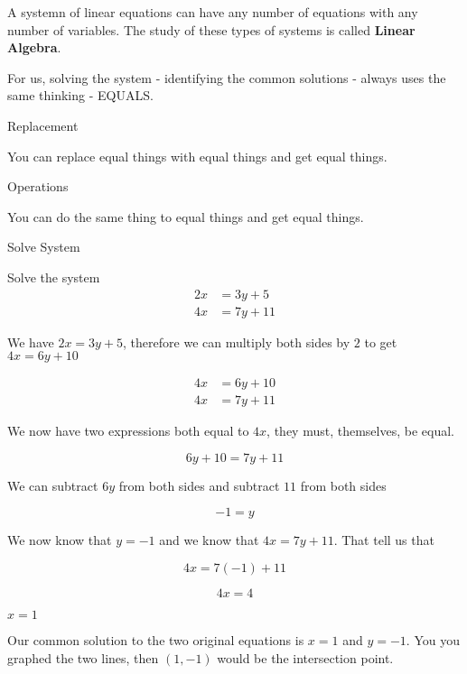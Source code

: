\documentclass{ximera}
\begin{document}
A systemn of linear equations can have any number of equations with any number of variables.  The study of these types of systems is called \textbf{Linear Algebra}.

For us, solving the system - identifying the common solutions - always uses the same thinking - EQUALS.



\begin{fact} Replacement

You can replace equal things with equal things and get equal things.

\end{fact}


\begin{fact} Operations

You can do the same thing to equal things and get equal things.

\end{fact}






\begin{example} Solve System


Solve the system
\begin{align*}
2x & = 3y + 5 \\
4x & = 7y + 11
\end{align*}


We have $2x = 3y + 5$, therefore we can multiply both sides by $2$ to get $4x = 6y + 10$

\begin{align*}
4x & = 6y + 10 \\
4x & = 7y + 11
\end{align*}


We now have two expressions both equal to $4x$, they must, themselves, be equal.


\[   6y + 10 =  7y + 11   \]

We can subtract $6y$ from both sides and subtract $11$ from both sides


\[   -1 =  y   \]



We now know that $y=-1$ and we know that $4x = 7y + 11$.  That tell us that 


\[   4x = 7(-1) + 11   \]

\[   4x = 4   \]


$x = 1$


Our common solution to the two original equations is $x = 1$ and $y = -1$.  You you graphed the two lines, then $(1, -1)$ would be the intersection point.














\end{example}
\end{document}
